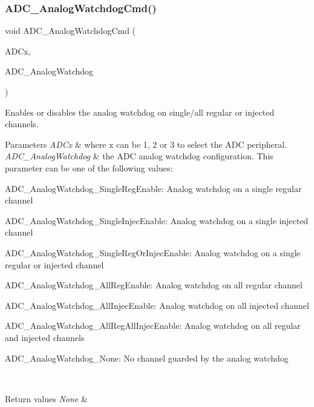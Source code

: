 \subsubsection{\texorpdfstring{ADC\_AnalogWatchdogCmd()}{ADC\_AnalogWatchdogCmd()}}
{\footnotesize\ttfamily void A\+D\+C\+\_\+\+Analog\+Watchdog\+Cmd (\begin{DoxyParamCaption}\item[{\mbox{\hyperlink{struct_a_d_c___type_def}{A\+D\+C\+\_\+\+Type\+Def}} $\ast$}]{A\+D\+Cx,  }\item[{uint32\+\_\+t}]{A\+D\+C\+\_\+\+Analog\+Watchdog }\end{DoxyParamCaption})}



Enables or disables the analog watchdog on single/all regular or injected channels. 


\begin{DoxyParams}{Parameters}
{\em A\+D\+Cx} & where x can be 1, 2 or 3 to select the A\+DC peripheral. \\
\hline
{\em A\+D\+C\+\_\+\+Analog\+Watchdog} & the A\+DC analog watchdog configuration. This parameter can be one of the following values\+: \begin{DoxyItemize}
\item A\+D\+C\+\_\+\+Analog\+Watchdog\+\_\+\+Single\+Reg\+Enable\+: Analog watchdog on a single regular channel \item A\+D\+C\+\_\+\+Analog\+Watchdog\+\_\+\+Single\+Injec\+Enable\+: Analog watchdog on a single injected channel \item A\+D\+C\+\_\+\+Analog\+Watchdog\+\_\+\+Single\+Reg\+Or\+Injec\+Enable\+: Analog watchdog on a single regular or injected channel \item A\+D\+C\+\_\+\+Analog\+Watchdog\+\_\+\+All\+Reg\+Enable\+: Analog watchdog on all regular channel \item A\+D\+C\+\_\+\+Analog\+Watchdog\+\_\+\+All\+Injec\+Enable\+: Analog watchdog on all injected channel \item A\+D\+C\+\_\+\+Analog\+Watchdog\+\_\+\+All\+Reg\+All\+Injec\+Enable\+: Analog watchdog on all regular and injected channels \item A\+D\+C\+\_\+\+Analog\+Watchdog\+\_\+\+None\+: No channel guarded by the analog watchdog \end{DoxyItemize}
\\
\hline
\end{DoxyParams}

\begin{DoxyRetVals}{Return values}
{\em None} & \\
\hline
\end{DoxyRetVals}
\mbox{\label{group___a_d_c___exported___functions_ga03cef3d12292ffa2b8520524d5b0226c}} 
